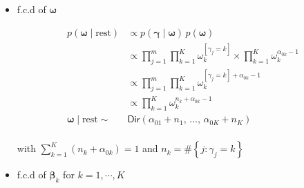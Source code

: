 \begin{appendix}
\begin{itemize}
\newpage

\item f.c.d of $\bm{\omega}$

\begin{equation}
\begin{split}
p(\bm{\omega} \mid \text{rest}) 
&\propto  p(\bm{\gamma} \mid \bm{\omega}) 
\, p(\bm{\omega})\\
&\propto \prod_{j=1}^{m} \prod_{k=1}^{K} \omega_k^{[\gamma_j = k]} 
\times \prod_{k=1}^{K} \omega_k^{\alpha_{0k}-1} \\
&\propto\prod_{j=1}^{m} \prod_{k=1}^{K} \omega_k^{[\gamma_j = k]+{\alpha_{0k}-1}}\\
&\propto \prod_{k=1}^{K} \omega_k^{n_k + \alpha_{0k} - 1}\\
\bm{\omega} \mid \text{rest} \sim& \mathsf{Dir}(\alpha_{01} + n_1,\,  \dots,\, \alpha_{0K} + n_K)\\
\end{split}
\end{equation}

with $\sum_{k=1}^{K} \left(n_k+\alpha_{0k}\right) = 1$ and $n_k=\#\left\lbrace j : \gamma_j=k\right\rbrace$

\item f.c.d of $\bm{\beta}_k$ for $k=1,\cdots,K$


\end{itemize}
\end{appendix}
